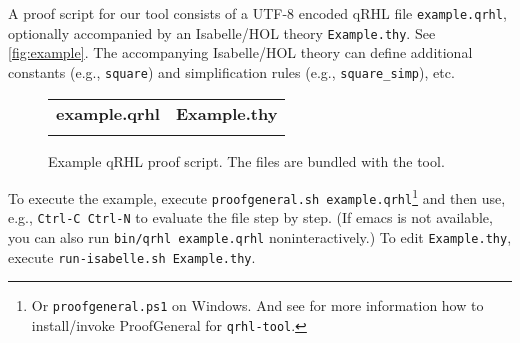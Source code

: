 \documentclass{article}
\begin{document}
A proof script for our tool consists of a UTF-8 encoded qRHL file
\texttt{example.qrhl}, optionally accompanied by an Isabelle/HOL
theory \texttt{Example.thy}. See \autoref{fig:example}. The
accompanying Isabelle/HOL theory can define additional constants
(e.g., \texttt{square}) and simplification rules (e.g.,
\texttt{square\_simp}), etc.  

\begin{figure}[t]\centering
  \lstset{aboveskip=0pt,belowskip=0pt,frame=single}
  \centering
  \begin{tabular}{p{.45\hsize}p{.45\hsize}}
    \textbf{example.qrhl}
    &
      \textbf{Example.thy}
    \\[-5pt]
    
    &
      
  \end{tabular}
  \vspace*{-5mm}
  \caption{Example qRHL proof script. The files are bundled with the tool.}
  \label{fig:example}
\end{figure}

To execute the example, execute \texttt{proofgeneral.sh
  example.qrhl}\footnote{Or \texttt{proofgeneral.ps1} on Windows.
  And see \cite{proofgeneral-config} for more information how to install/invoke ProofGeneral for \texttt{qrhl-tool}.}
  and then use, e.g., \texttt{Ctrl-C Ctrl-N} to evaluate
the file step by step. (If emacs is not available, you can also run
\texttt{bin/qrhl example.qrhl} noninteractively.) To edit
\texttt{Example.thy}, execute \texttt{run-isabelle.sh Example.thy}.
\end{document}
